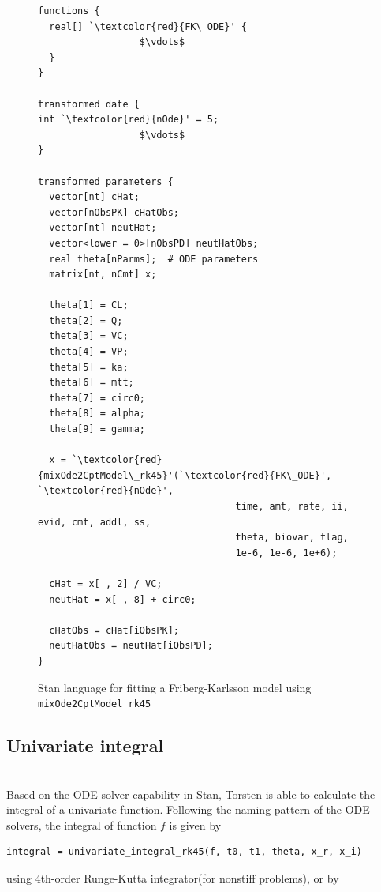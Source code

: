 \documentclass[11pt]{amsart}
\newenvironment{fmpage}[1]
     {\begin{lrbox}{\fmbox}\begin{minipage}{#1}}
     {\end{minipage}\end{lrbox}\fbox{\usebox{\fmbox}}}
\begin{document}
\begin{figure}
\caption{Stan language for fitting a Friberg-Karlsson model using \texttt{mixOde2CptModel\_rk45}}
\begin{center}
\begin{small}
\begin{fmpage}{\textwidth - .75in}
\begin{lstlisting}[basicstyle=\footnotesize\ttfamily,mathescape=true,flexiblecolumns=true,frame=single,escapeinside=`']
functions {
  real[] `\textcolor{red}{FK\_ODE}' {
                  $\vdots$	
  }
}

transformed date {
int `\textcolor{red}{nOde}' = 5;
                  $\vdots$
}

transformed parameters {
  vector[nt] cHat;
  vector[nObsPK] cHatObs;
  vector[nt] neutHat;
  vector<lower = 0>[nObsPD] neutHatObs;
  real theta[nParms];  # ODE parameters
  matrix[nt, nCmt] x;
  
  theta[1] = CL;
  theta[2] = Q;
  theta[3] = VC;
  theta[4] = VP;
  theta[5] = ka;
  theta[6] = mtt;
  theta[7] = circ0;
  theta[8] = alpha;
  theta[9] = gamma;

  x = `\textcolor{red}{mixOde2CptModel\_rk45}'(`\textcolor{red}{FK\_ODE}', `\textcolor{red}{nOde}',
                                   time, amt, rate, ii, evid, cmt, addl, ss,
                                   theta, biovar, tlag,
                                   1e-6, 1e-6, 1e+6);

  cHat = x[ , 2] / VC;
  neutHat = x[ , 8] + circ0;

  cHatObs = cHat[iObsPK];
  neutHatObs = neutHat[iObsPD];
}
\end{lstlisting}
\end{fmpage}
\end{small}
\end{center}
\label{FK_mix2}
\end{figure}

\subsection{Univariate integral} \ \\
Based on the ODE solver capability in Stan, Torsten is able
to calculate the integral of a univariate
function. Following the naming pattern of the ODE
solvers, the integral of function $f$ is given by

\begin{verbatim}
integral = univariate_integral_rk45(f, t0, t1, theta, x_r, x_i)
\end{verbatim}
using 4th-order Runge-Kutta integrator(for nonstiff problems), or by
\end{document}
